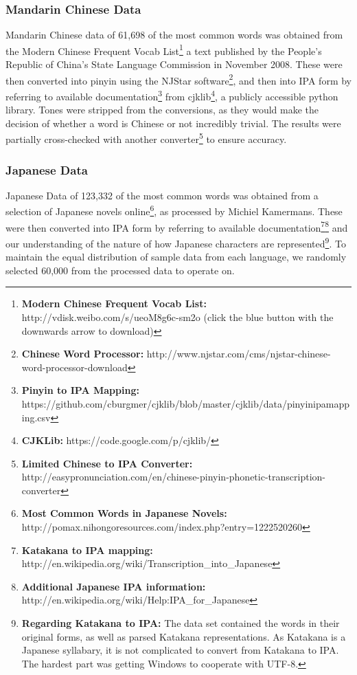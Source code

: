 \documentclass[a4paper]{article}
\begin{document}
\subsubsection{Mandarin Chinese Data}
Mandarin Chinese data of 61,698 of the most common words was obtained from the Modern Chinese Frequent Vocab List\footnote{\textbf{Modern Chinese Frequent Vocab List: }http://vdisk.weibo.com/s/ueoM8g6c-sm2o (click the blue button with the downwards arrow to download)} a text published by the People's Republic of China's State Language Commission in November 2008. These were then converted into pinyin using the NJStar software\footnote{\textbf{Chinese Word Processor: }http://www.njstar.com/cms/njstar-chinese-word-processor-download}, and then into IPA form by referring to available documentation\footnote{\textbf{Pinyin to IPA Mapping:} https://github.com/cburgmer/cjklib/blob/master/cjklib/data/pinyinipamapping.csv} from cjklib\footnote{\textbf{CJKLib: }https://code.google.com/p/cjklib/}, a publicly accessible python library. Tones were stripped from the conversions, as they would make the decision of whether a word is Chinese or not incredibly trivial. The results were partially cross-checked with another converter\footnote{\textbf{Limited Chinese to IPA Converter: }http://easypronunciation.com/en/chinese-pinyin-phonetic-transcription-converter} to ensure accuracy.
\subsubsection{Japanese Data}
Japanese Data of 123,332 of the most common words was obtained from a selection of Japanese novels online\footnote{\textbf{Most Common Words in Japanese Novels:} http://pomax.nihongoresources.com/index.php?entry=1222520260}, as processed by Michiel Kamermans. These were then converted into IPA form by referring to available documentation\footnote{\textbf{Katakana to IPA mapping: }http://en.wikipedia.org/wiki/Transcription\_into\_Japanese}\footnote{\textbf{Additional Japanese IPA information: }http://en.wikipedia.org/wiki/Help:IPA\_for\_Japanese} and our understanding of the nature of how Japanese characters are represented\footnote{\textbf{Regarding Katakana to IPA: }The data set contained the words in their original forms, as well as parsed Katakana representations. As Katakana is a Japanese syllabary, it is not complicated to convert from Katakana to IPA. The hardest part was getting Windows to cooperate with UTF-8.}. To maintain the equal distribution of sample data from each language, we randomly selected 60,000 from the processed data to operate on.
\end{document}
